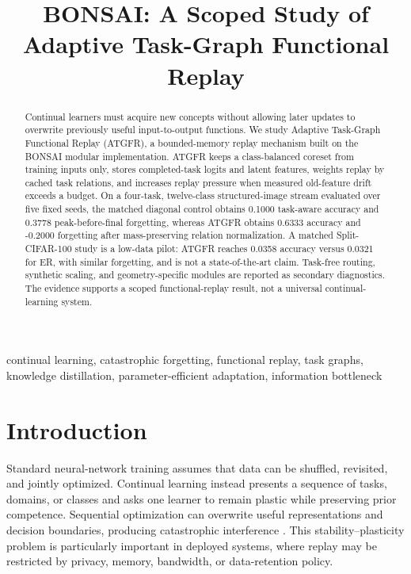 \documentclass[conference]{IEEEtran}
\title{BONSAI: A Scoped Study of Adaptive Task-Graph Functional Replay}
\author{\IEEEauthorblockN{BONSAI Research Team}
\IEEEauthorblockA{Independent Research Group\\
Seattle, Washington, USA}}
\begin{document}
\maketitle

\begin{abstract}
Continual learners must acquire new concepts without allowing later updates to
overwrite previously useful input-to-output functions. We study Adaptive
Task-Graph Functional Replay (ATGFR), a bounded-memory replay mechanism built
on the BONSAI modular implementation. ATGFR keeps a class-balanced coreset
from training inputs only, stores completed-task logits and latent features,
weights replay by cached task relations, and increases replay pressure when
measured old-feature drift exceeds a budget. On a four-task, twelve-class
structured-image stream evaluated over five fixed seeds, the matched diagonal
control obtains 0.1000 task-aware accuracy and 0.3778 peak-before-final
forgetting, whereas ATGFR obtains 0.6333 accuracy and -0.2000 forgetting after
mass-preserving relation normalization. A matched Split-CIFAR-100 study is a
low-data pilot: ATGFR reaches 0.0358 accuracy versus 0.0321 for ER, with
similar forgetting, and is not a state-of-the-art claim. Task-free routing,
synthetic scaling, and geometry-specific modules are reported as secondary
diagnostics. The evidence supports a scoped functional-replay result, not a
universal continual-learning system.
\end{abstract}

\begin{IEEEkeywords}
continual learning, catastrophic forgetting, functional replay, task graphs,
knowledge distillation, parameter-efficient adaptation, information bottleneck
\end{IEEEkeywords}

\section{Introduction}
\label{sec:introduction}

Standard neural-network training assumes that data can be shuffled, revisited,
and jointly optimized. Continual learning instead presents a sequence of
tasks, domains, or classes and asks one learner to remain plastic while
preserving prior competence. Sequential optimization can overwrite useful
representations and decision boundaries, producing catastrophic interference
\cite{mccloskey1989catastrophic}. This stability--plasticity problem is
particularly important in deployed systems, where replay may be restricted by
privacy, memory, bandwidth, or data-retention policy.
\end{document}
